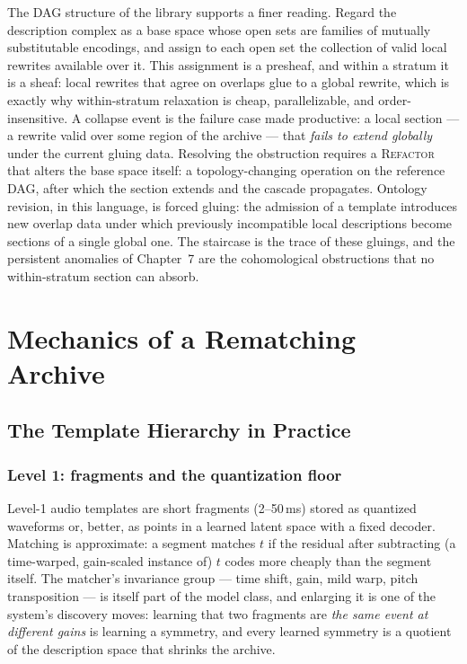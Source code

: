 \documentclass[11pt,oneside]{book}
\theoremstyle{remark}
\begin{document}
The DAG structure of the library supports a finer reading. Regard the
description complex as a base space whose open sets are families of
mutually substitutable encodings, and assign to each open set the
collection of valid local rewrites available over it. This assignment
is a presheaf, and within a stratum it is a sheaf: local rewrites that
agree on overlaps glue to a global rewrite, which is exactly why
within-stratum relaxation is cheap, parallelizable, and
order-insensitive. A collapse event is the failure case made
productive: a local section --- a rewrite valid over some region of
the archive --- that \emph{fails to extend globally} under the current
gluing data. Resolving the obstruction requires a \textsc{Refactor}
that alters the base space itself: a topology-changing operation on
the reference DAG, after which the section extends and the cascade
propagates. Ontology revision, in this language, is forced gluing: the
admission of a template introduces new overlap data under which
previously incompatible local descriptions become sections of a single
global one. The staircase is the trace of these gluings, and the
persistent anomalies of Chapter~7 are the cohomological obstructions
that no within-stratum section can absorb.

\part{Mechanics of a Rematching Archive}

\chapter{The Template Hierarchy in Practice}

\section{Level 1: fragments and the quantization floor}

Level-1 audio templates are short fragments (2--50\,ms) stored as
quantized waveforms or, better, as points in a learned latent space with
a fixed decoder. Matching is approximate: a segment matches $t$ if the
residual after subtracting (a time-warped, gain-scaled instance of) $t$
codes more cheaply than the segment itself. The matcher's invariance
group --- time shift, gain, mild warp, pitch transposition --- is itself
part of the model class, and enlarging it is one of the system's
discovery moves: learning that two fragments are \emph{the same event at
different gains} is learning a symmetry, and every learned symmetry is a
quotient of the description space that shrinks the archive.
\end{document}
